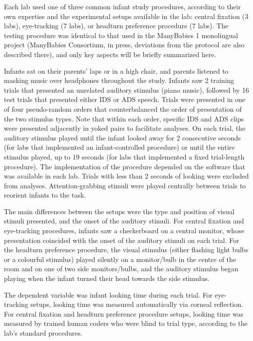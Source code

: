 \documentclass[,man,floatsintext]{apa6}
\begin{document}
Each lab used one of three common infant study procedures, according to their own expertise and the experimental setups available in the lab: central fixation (3 labs), eye-tracking (7 labs), or headturn preference procedure (7 labs). The testing procedure was identical to that used in the ManyBabies 1 monolingual project (ManyBabies Consortium, in press, deviations from the protocol are also described there), and only key aspects will be briefly summarized here.

Infants sat on their parents' laps or in a high chair, and parents listened to masking music over headphones throughout the study. Infants saw 2 training trials that presented an unrelated auditory stimulus (piano music), followed by 16 test trials that presented either IDS or ADS speech. Trials were presented in one of four pseudo-random orders that counterbalanced the order of presentation of the two stimulus types. Note that within each order, specific IDS and ADS clips were presented adjacently in yoked pairs to facilitate analyses. On each trial, the auditory stimulus played until the infant looked away for 2 consecutive seconds (for labs that implemented an infant-controlled procedure) or until the entire stimulus played, up to 19 seconds (for labs that implemented a fixed trial-length procedure). The implementation of the procedure depended on the software that was available in each lab. Trials with less than 2 seconds of looking were excluded from analyses. Attention-grabbing stimuli were played centrally between trials to reorient infants to the task.

The main differences between the setups were the type and position of visual stimuli presented, and the onset of the auditory stimuli. For central fixation and eye-tracking procedures, infants saw a checkerboard on a central monitor, whose presentation coincided with the onset of the auditory stimuli on each trial. For the headturn preference procedure, the visual stimulus (either flashing light bulbs or a colourful stimulus) played silently on a monitor/bulb in the centre of the room and on one of two side monitors/bulbs, and the auditory stimulus began playing when the infant turned their head towards the side stimulus.

The dependent variable was infant looking time during each trial. For eye-tracking setups, looking time was measured automatically via corneal reflection. For central fixation and headturn preference procedure setups, looking time was measured by trained human coders who were blind to trial type, according to the lab's standard procedures.
\end{document}
